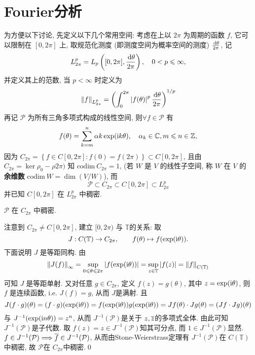 \section{Fourier分析}
	为方便以下讨论, 先定义以下几个常用空间: 考虑在\R 上以 $ 2\pi $ 为周期的函数 $ f $, 它可以限制在 $ [0, 2\pi] $ 上, 取规范化测度 (即测度空间为概率空间的测度) $ \frac{\diff\theta}{2\pi} $, 记
	\[
		L_{2\pi}^{p}=L_{p}\left([0, 2\pi], \frac{\diff\theta}{2\pi}\right), \quad 0<p\leqslant\infty,
	\]
	并定义其上的范数, 当 $ p<\infty $ 时定义为
	\[
		\norm{f}_{L_{2\pi}^{p}}=\left( \int_{0}^{2\pi}\abs{f(\theta)}^{p}\frac{\diff\theta}{2\pi} \right)^{1/p}
	\]
	再记 $ \mathcal{P} $ 为所有三角多项式构成的线性空间, 则$ \forall f\in\mathcal{P} $ 有
	\[
		f(\theta)=\sum_{k=m}^{n}\alpha{k}\exp(\imag k\theta), \quad \alpha_{k}\in\C, m\leqslant n\in\Z,
	\]
	因为 $ C_{2\pi}=\left\{ f\in C[0, 2\pi]: f(0)=f(2\pi) \right\}\subset C[0, 2\pi] $, 且由 $ C_{2\pi}=\ker\rho_{0}-\rho{2\pi}) $ 知 $ \mathrm{codim}\ C_{2\pi}=1 $, (若 $ W $ 是 $ V $ 的线性子空间, 称 $ W $ 在 $ V $ 的\textbf{余维数} $ \mathrm{codim}\ W=\dim (V/W) $), 而
	\[
		\mathcal{P}\subset C_{2\pi}\subset C[0, 2\pi]\subset L_{2\pi}^{p}
	\]
	并已知 $ C[0, 2\pi] $ 在 $ L_{2\pi}^{p} $ 中稠密. 

	\begin{Lemma}
		$ \mathcal P $ 在 $ C_{2\pi} $ 中稠密.
	\end{Lemma}
	\begin{Proof}
		注意到 $ C_{2\pi}\ne C[0,2\pi] $, 建立 $ [0,2\pi) $ 与 $ \mathbb T $的关系: 取
		\[
			J : C(\mathbb T) \to C_{2\pi},\qquad f(\theta)\mapsto f(\exp(\imag\theta)).
		\]
		下面说明 $ J $ 是等距同构. 由
		\[
			\norm{J(f)}_\infty=\sup_{0\leqslant\theta\leqslant 2\pi}\abs{f(\exp(\imag\theta))}=\sup_{z\in\mathbb T}\abs{f(z)}=\norm{f}_{C(\mathbb T)}
		\]
		可知 $ J $ 是等距单射. 又对任意 $ g\in C_{2\pi} $, 定义 $ f(z)=g(\theta) $, 其中 $ z=\exp(\imag\theta) $, 则 $ f $ 是连续函数, i.e. $ J(f)=g $, 从而 $ J $是满射. 且
		\[
			J(f\cdot g)(\theta)=(f\cdot g)(\exp(\imag\theta))=f(\exp(\imag\theta))g(\exp(\imag\theta))=Jf(\theta)\cdot Jg(\theta)=(Jf\cdot Jg)(\theta)
		\]
		与 $ J^{-1}(\exp(\imag n\theta))=z^n $, 从而 $ J^{-1}(\mathcal P) $是关于 $ z,\baro{z} $的多项式全体. 由此可知 $ J^{-1}(\mathcal P) $是子代数. 取 $ f(z)=z\in J^{-1}(\mathcal P) $知其可分点, 而 $ 1\in J^{-1}(\mathcal P) $显然. $ f\in J^{-1}(\mathcal P)\Longrightarrow \baro{f}\in J^{-1}(\mathcal P) $, 从而由Stone-Weierstrass定理有 $ J^{-1}(\mathcal P) $在 $ C(\mathbb T) $中稠密, 故 $ \mathcal P $在 $ C_{2\pi} $中稠密.\qed
	\end{Proof}

